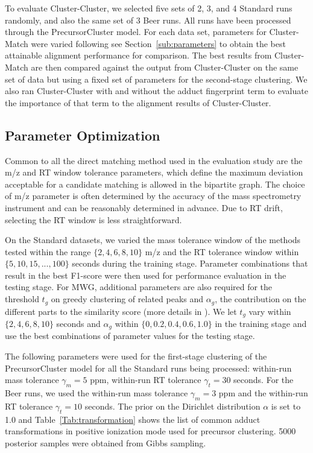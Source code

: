 To evaluate Cluster-Cluster, we selected five sets of 2, 3, and 4 Standard runs randomly, and also the same set of 3 Beer runs. All runs have been processed through the PrecursorCluster model. For each data set, parameters for Cluster-Match were varied following see Section~\ref{sub:parameters} to obtain the best attainable alignment performance for comparison. The best results from Cluster-Match are then compared against the output from Cluster-Cluster on the same set of data but using a fixed set of parameters for the second-stage clustering. We also ran Cluster-Cluster with and without the adduct fingerprint term to evaluate the importance of that term to the alignment results of Cluster-Cluster.

\subsection{Parameter Optimization\label{sub:parameters}}

Common to all the direct matching method used in the evaluation study are the m/z and RT window tolerance parameters, which define the maximum deviation acceptable for a candidate matching is allowed in the bipartite graph. The choice of m/z parameter is often determined by the accuracy of the mass spectrometry instrument and can be reasonably determined in advance. Due to RT drift, selecting the RT window is less straightforward. 

On the Standard datasets, we varied the mass tolerance window of the methods tested within the range $\{2, 4, 6, 8, 10\}$ m/z and the RT tolerance window within $\{5, 10, 15, ..., 100\}$ seconds during the training stage. Parameter combinations that result in the best F1-score were then used for performance evaluation in the testing stage. For MWG, additional parameters are also required for the threshold $t_{g}$ on greedy clustering of related peaks and $\alpha_{g}$, the contribution on the different parts to the similarity score (more details in \cite{Wandy2015}). We let $t_g$ vary within $\{2, 4, 6, 8, 10\}$ seconds and $\alpha_g$ within $\{0, 0.2, 0.4, 0.6, 1.0\}$ in the training stage and use the best combinations of parameter values for the testing stage.

The following parameters were used for the first-stage clustering of the PrecursorCluster model for all the Standard runs being processed: within-run mass tolerance $\gamma_m=5$ ppm, within-run RT tolerance $\gamma_t=30$ seconds. For the Beer runs, we used the within-run mass tolerance $\gamma_m=3$ ppm and the within-run RT tolerance $\gamma_t=10$ seconds. The prior on the Dirichlet distribution $\alpha$ is set to 1.0 and Table~\ref{Tab:transformation} shows the list of common adduct transformations in positive ionization mode used for precursor clustering. 5000 posterior samples were obtained from Gibbs sampling.

